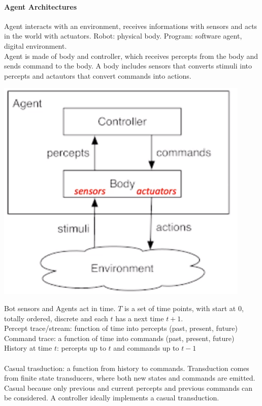 \documentclass[10pt]{report}
\begin{document}
\paragraph{Agent Architectures} Agent interacts with an environment, receives informations with sensors and acts in the world with actuators. Robot: physical body. Program: software agent, digital environment.\\
Agent is made of body and controller, which receives percepts from the body and sends command to the body. A body includes sensors that converts stimuli into percepts and actautors that convert commands into actions.
\begin{center}
	\includegraphics[scale=0.5]{3.png}
\end{center}
Bot sensors and %
Agents act in time. $T$ is a set of time points, with start at 0, totally ordered, discrete and each $t$ has a next time $t+1$.\\
Percept trace/stream: function of time into percepts (past, present, future)\\
Command trace: a function of time into commands (past, present, future)\\
History at time $t$: percepts up to $t$ and commands up to $t-1$\\\\
Casual trasduction: a function from history to commands. Transduction comes from finite state transducers, where both new states and commands are emitted. Casual because only previous and current percepts and previous commands can be considered. A controller ideally implements a casual transduction.
\end{document}
